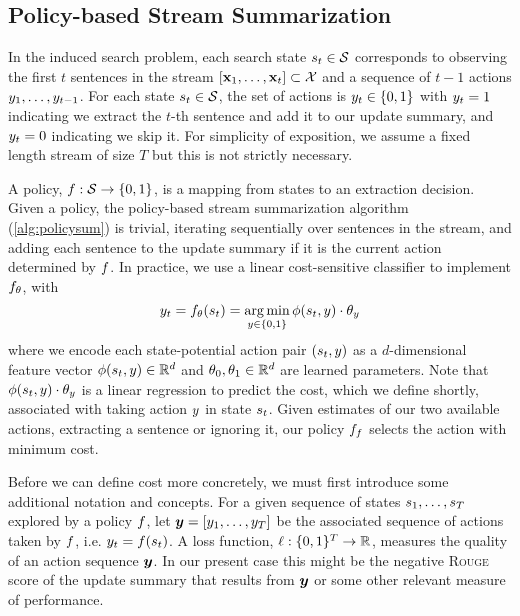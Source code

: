 \subsection{Policy-based Stream Summarization}

In the induced search problem, each search state $s_t \in \mathcal{S}$
corresponds to observing the first $t$ sentences in the stream $\left[
\mathbf{x}_1,\ldots, \mathbf{x}_t \right] \subset \mathcal{X}$ and a sequence of
$t-1$ actions $y_1, \ldots, y_{t-1}$.  For each state $s_t \in
\mathcal{S}$, the set of actions is $y_t \in \{0,1\}$ with $y_t =1$
indicating we extract the $t$-th sentence and add it to our update summary,
and $y_t = 0$ indicating we skip it. For simplicity of exposition, we
assume a fixed length stream of size $T$ but this is not strictly necessary. 



A policy, $f : \mathcal{S} \rightarrow \{0,1\}$, is a mapping from states to
an extraction decision. Given a policy, the policy-based stream summarization
algorithm (\autoref{alg:policysum}) is trivial, iterating sequentially over
sentences in the stream, and adding each sentence to the update summary if it
is the current action determined by $f$.  In practice, we use a linear
cost-sensitive classifier to implement $f_{\theta}$, with \[ y_t =
f_{\theta}(s_t) = \operatorname*{arg\,min}_{y \in \{0,1\}} \phi(s_t, y)\cdot
\theta_y\] where we encode each state-potential action pair
$(s_t,y)$ as a $d$-dimensional feature vector  $\phi(s_t,
y) \in \mathbb{R}^d$ and $\theta_0, \theta_1 \in \mathbb{R}^{d}$ are learned
parameters.  Note that $\phi(s_t,y)\cdot \theta_y$ is a linear
regression to predict the cost, which we define shortly, associated with
taking action $y$ in state $s_t$. Given estimates of our two
available actions, extracting a sentence or ignoring it, our policy $f_f$
selects the action with minimum cost.

Before we can define cost more concretely, we must first introduce some additional notation and concepts.
For a given sequence of states $s_1,\ldots,s_T$ explored by a policy $f$, let $\boldsymbol{y}= \left[y_1,\ldots,y_T\right]$ be the associated 
sequence of actions taken by $f$, i.e. $y_t = f(s_t)$.
A loss function, $\ell : \{0,1\}^T \rightarrow \mathbb{R}$, measures the quality of an action 
sequence $\boldsymbol{y}$. In our present case this might be the negative \textsc{Rouge} 
score of the update summary that results from $\boldsymbol{y}$ or 
some other relevant measure of performance. 

